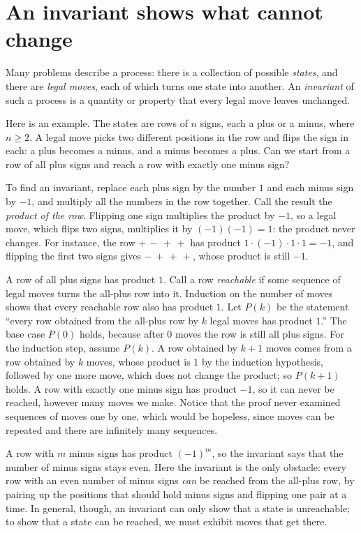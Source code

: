 \section{An invariant shows what cannot change}\label{ch05:sec:invariant}
Many problems describe a process: there is a collection of possible \emph{states}, and there are \emph{legal moves}, each of which turns one state into another. An \emph{invariant} of such a process is a quantity or property that every legal move leaves unchanged.

Here is an example. The states are rows of $n$ signs, each a plus or a minus, where $n\ge2$. A legal move picks two different positions in the row and flips the sign in each: a plus becomes a minus, and a minus becomes a plus. Can we start from a row of all plus signs and reach a row with exactly one minus sign?

To find an invariant, replace each plus sign by the number $1$ and each minus sign by $-1$, and multiply all the numbers in the row together. Call the result the \emph{product of the row}. Flipping one sign multiplies the product by $-1$, so a legal move, which flips two signs, multiplies it by $(-1)(-1)=1$: the product never changes. For instance, the row $+\,-\,+\,+$ has product $1\cdot(-1)\cdot1\cdot1=-1$, and flipping the first two signs gives $-\,+\,+\,+$, whose product is still $-1$.

A row of all plus signs has product $1$. Call a row \emph{reachable} if some sequence of legal moves turns the all-plus row into it. Induction on the number of moves shows that every reachable row also has product $1$. Let $P(k)$ be the statement ``every row obtained from the all-plus row by $k$ legal moves has product $1$.'' The base case $P(0)$ holds, because after $0$ moves the row is still all plus signs. For the induction step, assume $P(k)$. A row obtained by $k+1$ moves comes from a row obtained by $k$ moves, whose product is $1$ by the induction hypothesis, followed by one more move, which does not change the product; so $P(k+1)$ holds. A row with exactly one minus sign has product $-1$, so it can never be reached, however many moves we make. Notice that the proof never examined sequences of moves one by one, which would be hopeless, since moves can be repeated and there are infinitely many sequences.

A row with $m$ minus signs has product $(-1)^m$, so the invariant says that the number of minus signs stays even. Here the invariant is the only obstacle: every row with an even number of minus signs \emph{can} be reached from the all-plus row, by pairing up the positions that should hold minus signs and flipping one pair at a time. In general, though, an invariant can only show that a state is unreachable; to show that a state can be reached, we must exhibit moves that get there.

